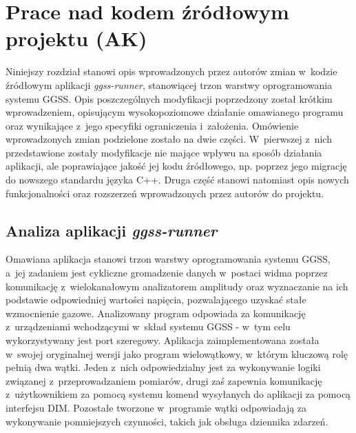 \chapter{Prace nad kodem źródłowym projektu (AK)}
\label{cha:code}

\graphicspath{{5_code/static/}}

Niniejszy rozdział stanowi opis wprowadzonych przez autorów zmian w~kodzie źródłowym aplikacji \emph{ggss-runner}, stanowiącej trzon warstwy oprogramowania systemu GGSS. Opis poszczególnych modyfikacji poprzedzony został krótkim wprowadzeniem, opisującym wysokopoziomowe działanie omawianego programu oraz wynikające z~jego specyfiki ograniczenia i~założenia. Omówienie wprowadzonych zmian podzielone zostało na dwie części. W~pierwszej z~nich przedstawione zostały modyfikacje nie mające wpływu na sposób działania aplikacji, ale poprawiające jakość jej kodu źródłowego, np. poprzez jego migrację do nowszego standardu języka C++. Druga część stanowi natomiast opis nowych funkcjonalności oraz rozszerzeń wprowadzonych przez autorów do projektu. 

\section{Analiza aplikacji \emph{ggss-runner}}
Omawiana aplikacja stanowi trzon warstwy oprogramowania systemu GGSS, a~jej zadaniem jest cykliczne gromadzenie danych w~postaci widma poprzez komunikację z~wielokanałowym analizatorem amplitudy oraz wyznaczanie na ich podstawie odpowiedniej wartości napięcia, pozwalającego uzyskać stałe wzmocnienie gazowe. Analizowany program odpowiada za komunikację z~urządzeniami wchodzącymi w~skład systemu GGSS - w~tym celu wykorzystywany jest port szeregowy. Aplikacja zaimplementowana została w~swojej oryginalnej wersji jako program wielowątkowy, w~którym kluczową rolę pełnią dwa wątki. Jeden z~nich odpowiedzialny jest za wykonywanie logiki związanej z~przeprowadzaniem pomiarów, drugi zaś zapewnia komunikację z~użytkownikiem za pomocą systemu komend wysyłanych do aplikacji za pomocą interfejsu DIM. Pozostałe tworzone w~programie wątki odpowiadają za wykonywanie pomniejszych czynności, takich jak obsługa dziennika zdarzeń.

